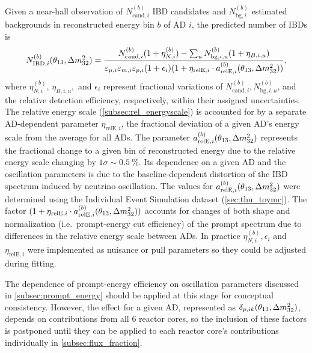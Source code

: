 Given a near-hall observation of $N_{\text{cand},i}^{(b)}$ IBD candidates
and $N_{\text{bg},i}^{(b)}$ estimated backgrounds in reconstructed energy bin $b$
of AD $i$,
the predicted number of IBDs is
\begin{equation}\label{eq:near_hall_bg_eff}
    N_{\text{IBD},i}^{(b)}(\theta_{13}, \Delta m^2_{32}) =
    \frac{N_{\text{cand},i}^{(b)}(1+\eta_{N,i}^{(b)})
        - \sum_u N_{\text{bg},i,u}^{(b)}(1+\eta_{B,i,u})}{
        \varepsilon_{\mu,i}\varepsilon_{m,i}\varepsilon_{p,i}(1+\epsilon_i)
        (1 + \eta_{\text{relE},i}\cdot a_{\text{relE},i}^{(b)}(\theta_{13}, \Delta m^2_{32}))
    },
\end{equation}
where $\eta_{N,i}^{(b)},\,\eta_{B,i,u},$ and $\epsilon_i$
represent fractional variations of
$N_{\text{cand},i}^{(b)},N_{\text{bg},i,u}^{(b)}$,
and the relative detection efficiency, respectively,
within their assigned uncertainties.
The relative energy scale (\cref{subsec:rel_energyscale})
is accounted for by a separate AD-dependent parameter $\eta_{\text{relE},i}$,
the fractional deviation of a given AD's energy scale
from the average for all ADs.
The parameter $a_{\text{relE},i}^{(b)}(\theta_{13}, \Delta m^2_{32})$
represents the fractional change to a given bin of reconstructed energy
due to the relative energy scale changing by $1\sigma \sim \SI{0.5}{\percent}$.
Its dependence on a given AD and the oscillation parameters is
due to the baseline-dependent distortion of the IBD spectrum
induced by neutrino oscillation.
The values for $a_{\text{relE},i}^{(b)}(\theta_{13}, \Delta m^2_{32})$ were determined using
the Individual Event Simulation dataset (\cref{sec:thu_toymc}).
The factor $(1 + \eta_{\text{relE},i}\cdot a_{\text{relE},i}^{(b)}(\theta_{13},\Delta m^2_{32}))$
accounts for changes of
both shape and normalization (i.e.\ prompt-energy cut efficiency)
of the prompt spectrum
due to differences in the relative energy scale between ADs.
In practice $\eta_{N,i}^{(b)},\epsilon_i$ and $\eta_{\text{relE},i}$
were implemented as nuisance or pull parameters
so they could be adjusted during fitting.

The dependence of prompt-energy efficiency on oscillation parameters
discussed in \cref{subsec:prompt_energy}
should be applied at this stage for conceptual consistency.
However, the effect for a given AD, represented as $\delta_{p,ik}(\theta_{13}, \Delta m^2_{32})$,
depends on contributions from all 6 reactor cores,
so the inclusion of these factors is postponed
until they can be applied to each reactor core's contributions
individually in \cref{subsec:flux_fraction}.

